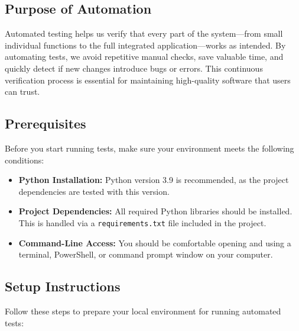 \subsection{Purpose of Automation}

Automated testing helps us verify that every part of the system—from small individual functions to the full integrated application—works as intended. By automating tests, we avoid repetitive manual checks, save valuable time, and quickly detect if new changes introduce bugs or errors. This continuous verification process is essential for maintaining high-quality software that users can trust.

\subsection{Prerequisites}

Before you start running tests, make sure your environment meets the following conditions:

\begin{itemize}
	\item \textbf{Python Installation:} Python version 3.9 is recommended, as the project dependencies are tested with this version.
	\item \textbf{Project Dependencies:} All required Python libraries should be installed. This is handled via a \texttt{requirements.txt} file included in the project.
	\item \textbf{Command-Line Access:} You should be comfortable opening and using a terminal, PowerShell, or command prompt window on your computer.
\end{itemize}

\subsection{Setup Instructions}

Follow these steps to prepare your local environment for running automated tests:

